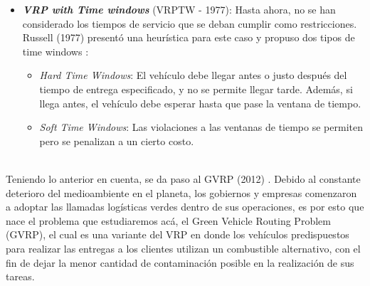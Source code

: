 \documentclass[letter, 10pt]{article}
\begin{document}
\begin{itemize}
    \item \textbf{\emph{VRP with Time windows}} (VRPTW - 1977): Hasta ahora, no se han considerado los tiempos de servicio que se deban cumplir como restricciones. Russell (1977) presentó una heurística para este caso y propuso dos tipos de time windows \cite{doi:10.1287/opre.25.3.517}:
    \begin{itemize}
        \item \emph{Hard Time Windows}: El vehículo debe llegar antes o justo después del tiempo de entrega especificado, y no se permite llegar tarde. Además, si llega antes, el vehículo debe esperar hasta que pase la ventana de tiempo.
        \item \emph{Soft Time Windows}: Las violaciones a las ventanas de tiempo se permiten pero se penalizan a un cierto costo.
    \end{itemize}
\end{itemize}
\\

Teniendo lo anterior en cuenta, se da paso al GVRP (2012) \cite{ERDOGANMILLERHOOKS}. Debido al constante deterioro del medioambiente en el planeta, los gobiernos y empresas comenzaron a adoptar las llamadas logísticas verdes dentro de sus operaciones, es por esto que nace el problema que estudiaremos acá, el Green Vehicle Routing Problem (GVRP), el cual es una variante del VRP en donde los vehículos predispuestos para realizar las entregas a los clientes utilizan un combustible alternativo, con el fin de dejar la menor cantidad de contaminación posible en la realización de sus tareas.
\\
\end{document}
